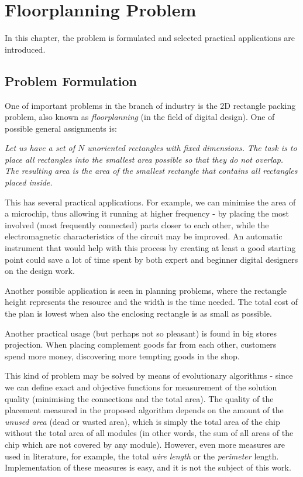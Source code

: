 \chapter{Floorplanning Problem}
\label{sec:problem}

In this chapter, the problem is formulated and selected practical applications are introduced.

\section{Problem Formulation}

One of important problems in the branch of industry is the 2D rectangle packing problem, also known as {\em floorplanning} (in the field of digital design). One of possible general assignments is:

\bigskip
\bigskip

{\em Let us have a set of $N$ unoriented rectangles with fixed dimensions. The task is to place all rectangles into the smallest area possible so that they do not overlap. The resulting area is the area of the smallest rectangle that contains all rectangles placed inside.}

\bigskip
\bigskip

This has several practical applications. For example, we can minimise the area of a microchip, thus allowing it running at higher frequency - by placing the most involved (most frequently connected) parts closer to each other, while the electromagnetic characteristics of the circuit may be improved. An automatic instrument that would help with this process by creating at least a good starting point could save a lot of time spent by both expert and beginner digital designers on the design work. 

Another possible application is seen in planning problems, where the rectangle height represents the resource and the width is the time needed. The total cost of the plan is lowest when also the enclosing rectangle is as small as possible. 

Another practical usage (but perhaps not so pleasant) is found in big stores projection. When placing complement goods far from each other, customers spend more money, discovering more tempting goods in the shop.

This kind of problem may be solved by means of evolutionary algorithms - since we can define exact and objective functions for measurement of the solution quality (minimising the connections and the total area). The quality of the placement measured in the proposed algorithm depends on the amount of the {\em unused area} (dead or wasted area), which is simply the total area of the chip without the total area of all modules (in other words, the sum of all areas of the chip which are not covered by any module). However, even more measures are used in literature, for example, the total {\em wire length} or the {\em perimeter} length. Implementation of these measures is easy, and it is not the subject of this work.

